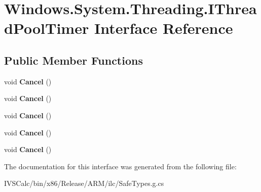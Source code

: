 \hypertarget{interface_windows_1_1_system_1_1_threading_1_1_i_thread_pool_timer}{}\section{Windows.\+System.\+Threading.\+I\+Thread\+Pool\+Timer Interface Reference}
\label{interface_windows_1_1_system_1_1_threading_1_1_i_thread_pool_timer}
\subsection*{Public Member Functions}
\begin{DoxyCompactItemize}
\item 
\mbox{\label{interface_windows_1_1_system_1_1_threading_1_1_i_thread_pool_timer_abd6e6bbfd27079f1a9afaebc49e4a8a9}} 
void {\bfseries Cancel} ()
\item 
\mbox{\label{interface_windows_1_1_system_1_1_threading_1_1_i_thread_pool_timer_abd6e6bbfd27079f1a9afaebc49e4a8a9}} 
void {\bfseries Cancel} ()
\item 
\mbox{\label{interface_windows_1_1_system_1_1_threading_1_1_i_thread_pool_timer_abd6e6bbfd27079f1a9afaebc49e4a8a9}} 
void {\bfseries Cancel} ()
\item 
\mbox{\label{interface_windows_1_1_system_1_1_threading_1_1_i_thread_pool_timer_abd6e6bbfd27079f1a9afaebc49e4a8a9}} 
void {\bfseries Cancel} ()
\item 
\mbox{\label{interface_windows_1_1_system_1_1_threading_1_1_i_thread_pool_timer_abd6e6bbfd27079f1a9afaebc49e4a8a9}} 
void {\bfseries Cancel} ()
\end{DoxyCompactItemize}


The documentation for this interface was generated from the following file\+:\begin{DoxyCompactItemize}
\item 
I\+V\+S\+Calc/bin/x86/\+Release/\+A\+R\+M/ilc/Safe\+Types.\+g.\+cs\end{DoxyCompactItemize}
